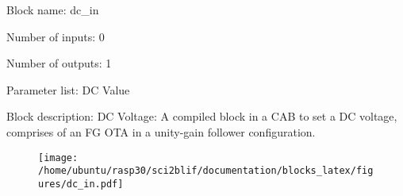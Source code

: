 \pagebreak

Block name: dc\_in

Number of inputs: 0

Number of outputs: 1

Parameter list: DC Value

Block description: 
DC Voltage: A compiled block in a CAB to set a DC voltage, comprises of an FG OTA in a unity-gain follower configuration.

\begin{figure}[H]  %
\texttt{[image: /home/ubuntu/rasp30/sci2blif/documentation/blocks\_latex/figures/dc\_in.pdf]}
\end{figure}

